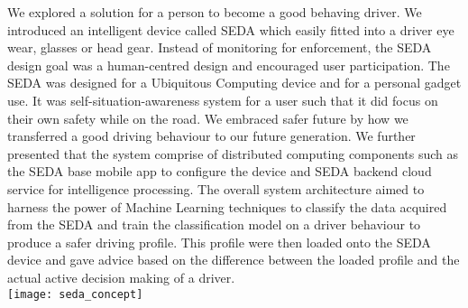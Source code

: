 \documentclass[main.tex]{subfiles}
\begin{document}
We explored a solution for a person to become a good behaving driver. We introduced an intelligent device called SEDA which easily fitted into a driver eye wear, glasses or head gear. Instead of monitoring for enforcement, the SEDA design goal was a human-centred design and encouraged user participation. The SEDA was designed for a Ubiquitous Computing device and for a personal gadget use. It was self-situation-awareness system for a user such that it did focus on their own safety while on the road. We embraced safer future by how we transferred a good driving behaviour to our future generation. We further presented that the system comprise of distributed computing components such as the SEDA base mobile app to configure the device and SEDA backend cloud service for intelligence processing. The overall system architecture aimed to harness the power of Machine Learning techniques to classify the data acquired from the SEDA and train the classification model on a driver behaviour to produce a safer driving profile. This profile were then loaded onto the SEDA device and gave advice based on the difference between the loaded profile and the actual active decision making of a driver.
\\

\texttt{[image: seda\_concept]}
\end{document}
